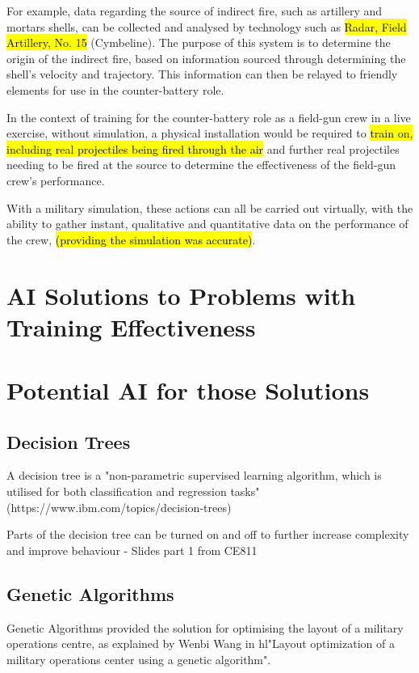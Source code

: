 \documentclass{article}
\begin{document}
For example, data regarding the source of indirect fire, such as artillery and mortars shells, can be collected and analysed by technology such as \hl{Radar, Field Artillery, No. 15} (Cymbeline). The purpose of this system is to determine the origin of the indirect fire, based on information sourced through determining the shell's velocity and trajectory. This information can then be relayed to friendly elements for use in the counter-battery role.

In the context of training for the counter-battery role as a field-gun crew in a live exercise, without simulation, a physical installation would be required to \hl{train on, including real projectiles being fired through the air} and further real projectiles needing to be fired at the source to determine the effectiveness of the field-gun crew's performance.

With a military simulation, these actions can all be carried out virtually, with the ability to gather instant, qualitative and quantitative data on the performance of the crew, \hl{(providing the simulation was accurate)}.

\section{AI Solutions to Problems with Training Effectiveness}

\section{Potential AI for those Solutions}

\subsection{Decision Trees}

A decision tree is a "non-parametric supervised learning algorithm, which is utilised for both classification and regression tasks" (https://www.ibm.com/topics/decision-trees)

Parts of the decision tree can be turned on and off to further increase complexity and improve behaviour - Slides part 1 from CE811

\subsection{Genetic Algorithms}

Genetic Algorithms provided the solution for optimising the layout of a military operations centre, as explained by Wenbi Wang in hl{"Layout optimization of a military operations center using a genetic algorithm".}
\end{document}
